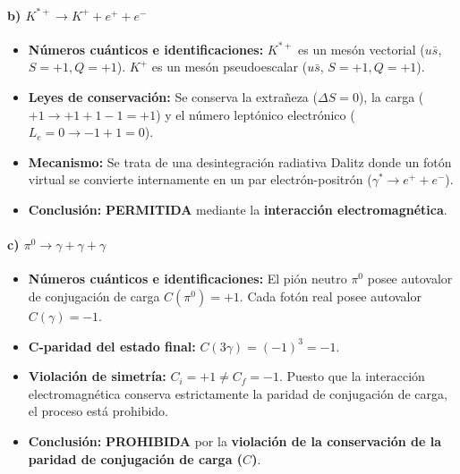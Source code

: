 \begin{problema}
\paragraph{b) $K^{*+} \rightarrow K^+ + e^+ + e^-$}
\begin{itemize}
    \item \textbf{Números cuánticos e identificaciones:} 
    $K^{*+}$ es un mesón vectorial ($u\bar{s}$, $S = +1, Q = +1$). 
    $K^+$ es un mesón pseudoescalar ($u\bar{s}$, $S = +1, Q = +1$).
    \item \textbf{Leyes de conservación:} Se conserva la extrañeza ($\Delta S = 0$), la carga ($+1 \to +1 + 1 - 1 = +1$) y el número leptónico electrónico ($L_e = 0 \to -1 + 1 = 0$).
    \item \textbf{Mecanismo:} Se trata de una desintegración radiativa Dalitz donde un fotón virtual se convierte internamente en un par electrón-positrón ($\gamma^* \to e^+ + e^-$).
    \item \textbf{Conclusión:} \textbf{PERMITIDA} mediante la \textbf{interacción electromagnética}.
\end{itemize}

\paragraph{c) $\pi^0 \rightarrow \gamma + \gamma + \gamma$}
\begin{itemize}
    \item \textbf{Números cuánticos e identificaciones:} 
    El pión neutro $\pi^0$ posee autovalor de conjugación de carga $C(\pi^0) = +1$.
    Cada fotón real posee autovalor $C(\gamma) = -1$.
    \item \textbf{C-paridad del estado final:} $C(3\gamma) = (-1)^3 = -1$.
    \item \textbf{Violación de simetría:} $C_i = +1 \neq C_f = -1$. Puesto que la interacción electromagnética conserva estrictamente la paridad de conjugación de carga, el proceso está prohibido.
    \item \textbf{Conclusión:} \textbf{PROHIBIDA} por la \textbf{violación de la conservación de la paridad de conjugación de carga ($C$)}.
\end{itemize}


\end{problema}
